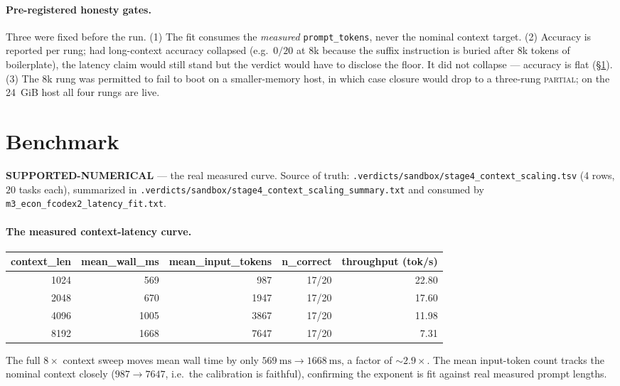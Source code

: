 \documentclass[11pt,a4paper]{article}
\newcommand{\green}[1]{\textcolor{green!50!black}{\textbf{#1}}}
\begin{document}
\paragraph{Pre-registered honesty gates.}
Three were fixed before the run. (1) The fit consumes the \emph{measured}
\texttt{prompt\_tokens}, never the nominal context target. (2) Accuracy is
reported per rung; had long-context accuracy collapsed (e.g.\ \(0/20\) at \(8\)k
because the suffix instruction is buried after \(8\)k tokens of boilerplate),
the latency claim would still stand but the verdict would have to disclose the
floor. It did not collapse --- accuracy is flat (\S\ref{sec:benchmark}). (3) The
\(8\)k rung was permitted to fail to boot on a smaller-memory host, in which
case closure would drop to a three-rung \textsc{partial}; on the \SI{24}{GiB}
host all four rungs are live.

\section{Benchmark}
\label{sec:benchmark}
\green{SUPPORTED-NUMERICAL} --- the real measured curve. Source of truth:
\texttt{.verdicts/sandbox/stage4\_context\_scaling.tsv} (4 rows,
\(20\) tasks each), summarized in
\texttt{.verdicts/sandbox/stage4\_context\_scaling\_summary.txt} and consumed by
\texttt{m3\_econ\_fcodex2\_latency\_fit.txt}.

\paragraph{The measured context-latency curve.}
\begin{center}
\begin{tabular}{rrrrr}
\toprule
context\_len & mean\_wall\_ms & mean\_input\_tokens & n\_correct & throughput (tok/s) \\
\midrule
1024 & 569  & 987  & 17/20 & 22.80 \\
2048 & 670  & 1947 & 17/20 & 17.60 \\
4096 & 1005 & 3867 & 17/20 & 11.98 \\
8192 & 1668 & 7647 & 17/20 & 7.31 \\
\bottomrule
\end{tabular}
\end{center}
\noindent The full \(8\times\) context sweep moves mean wall time by only
\(\SI{569}{\milli\second} \to \SI{1668}{\milli\second}\), a factor of
\(\sim\!2.9\times\). The mean input-token count tracks the nominal context
closely (\(987 \to 7647\), i.e.\ the calibration is faithful), confirming the
exponent is fit against real measured prompt lengths.
\end{document}
